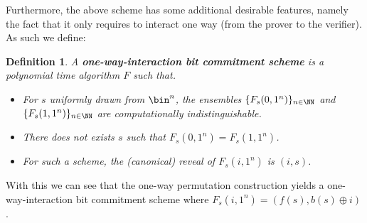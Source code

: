 \documentclass{article}
\newtheorem{definition}{Definition}
\begin{document}
Furthermore, the above scheme has some additional desirable features, namely the fact that it only requires to interact one way (from the prover to the verifier).
As such we define:
\begin{definition}
    A \textbf{one-way-interaction bit commitment scheme} is a polynomial time algorithm $F$ such that.
    \begin{itemize}
        \item For $s$ uniformly drawn from $\bin^n$, the ensembles $\{ F_s(0, 1^n) \}_{n \in \NN}$ and $\{ F_s(1, 1^n) \}_{n \in \NN}$ are computationally indistinguishable.
        \item There does not exists $s$ such that $F_s(0, 1^n) = F_s(1, 1^n)$.
        \item For such a scheme, the (canonical) reveal of $F_s(i, 1^n)$ is $(i, s)$.
    \end{itemize}
\end{definition}
With this we can see that the one-way permutation construction yields a one-way-interaction bit commitment scheme where $F_s(i, 1^n) = (f(s), b(s) \oplus i)$.
\end{document}
